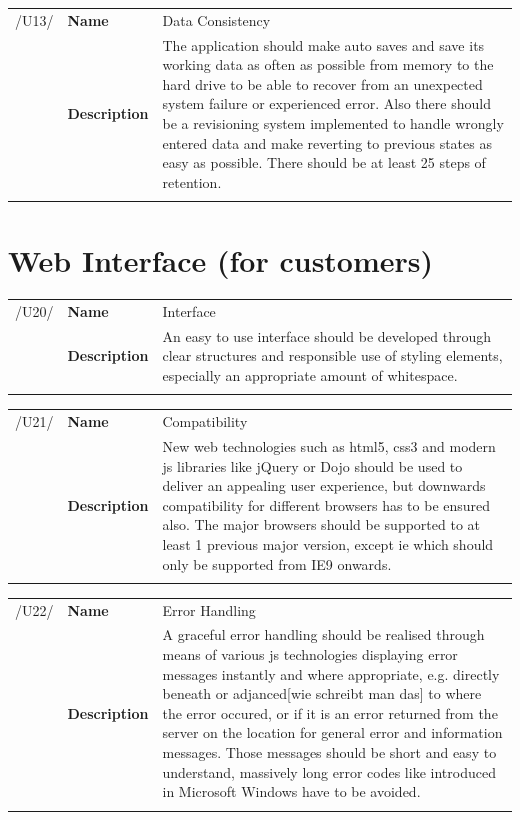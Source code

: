 \documentclass[11pt,a4paper,oneside,svgnames]{report}
\begin{document}
\noindent
\begin{tabular}{llp{8.75cm}}
\cellcolor{white}/U13/	& \textbf{Name}			& Data Consistency\\
\cellcolor{white}		& \textbf{Description}	& The application should make auto saves and save its working data as often as possible from memory to the hard drive to be able to recover from an unexpected system failure or experienced error. Also there should be a revisioning system implemented to handle wrongly entered data and make reverting to previous states as easy as possible. There should be at least 25 steps of retention.\\
\cellcolor{white}		\hfill \\
\end{tabular}

\section{Web Interface (for customers)}
\noindent
\begin{tabular}{llp{8.75cm}}
\cellcolor{white}/U20/	& \textbf{Name}			& Interface\\
\cellcolor{white}		& \textbf{Description}	& An easy to use interface should be developed through clear structures and responsible use of styling elements, especially an appropriate amount of whitespace.\\
\cellcolor{white}		\hfill \\
\end{tabular}

\noindent
\begin{tabular}{llp{8.75cm}}
\cellcolor{white}/U21/	& \textbf{Name}			& Compatibility\\
\cellcolor{white}		& \textbf{Description}	& New web technologies such as \acrshort{html}5, \acrshort{css}3 and modern \gls{js} libraries like jQuery or Dojo should be used to deliver an appealing user experience, but downwards compatibility for different browsers has to be ensured also. The major browsers should be supported to at least 1 previous major version, except \gls{ie} which should only be supported from IE9 onwards.\\
\cellcolor{white}		\hfill \\
\end{tabular}

\noindent
\begin{tabular}{llp{8.75cm}}
\cellcolor{white}/U22/	& \textbf{Name}			& Error Handling\\
\cellcolor{white}		& \textbf{Description}	& A graceful error handling should be realised through means of various \gls{js} technologies displaying error messages instantly and where appropriate, e.g. directly beneath or adjanced[wie schreibt man das] to where the error occured, or if it is an error returned from the server on the location for general error and information messages. Those messages should be short and easy to understand, massively long error codes like introduced in Microsoft Windows have to be avoided.\\
\cellcolor{white}		\hfill \\
\end{tabular}
\end{document}
